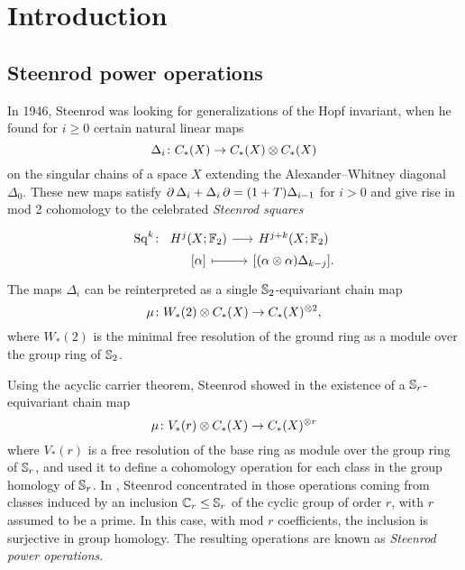 
\section{Introduction}\label{s:introduction}

\subsection{Steenrod power operations}

In 1946, Steenrod was looking for generalizations of the Hopf invariant, when he found for $i \geq 0$ certain natural linear maps
\[
\Delta_i \colon C_{*}(X) \to C_{*}(X) \otimes C_{*}(X)
\]
on the singular chains of a space $X$ extending the Alexander--Whitney diagonal $\Delta_0$.
These new maps satisfy $\operatorname{\partial}\Delta_i + \Delta_i\operatorname{\partial} = (1+T)\Delta_{i-1}$ for $i > 0$ and give rise in mod 2 cohomology to the celebrated \emph{Steenrod squares}
\[
\begin{tikzcd}[column sep=small, row sep=0]
	\Sq^{k} \colon &[-15pt] H^j(X;\mathbb{F}_2) \arrow[r] & H^{j+k}(X;\mathbb{F}_2) \\
	& {[\alpha]} \arrow[r, mapsto] & {[(\alpha \otimes \alpha)\Delta_{k-j}]}.
\end{tikzcd}
\]
The maps $\Delta_i$ can be reinterpreted as a single $\mathbb{S}_2$-equivariant chain map
\[
\mu \colon W_*(2) \otimes C_{*}(X) \to C_{*}(X)^{\otimes 2},
\]
where $W_*(2)$ is the minimal free resolution of the ground ring as a module over the group ring of $\mathbb{S}_2$.

Using the acyclic carrier theorem, Steenrod showed in \cite{steenrod1952reduced} the existence of a $\mathbb{S}_r$-equivariant chain map
\[
\mu \colon V_\ast(r) \otimes C_{*}(X) \to C_{*}(X)^{\otimes r}
\]
where $V_\ast(r)$ is a free resolution of the base ring as module over the group ring of $\mathbb{S}_r$, and used it to define a cohomology operation for each class in the group homology of $\mathbb{S}_r$.
In \cite{steenrod1953cyclic}, Steenrod concentrated in those operations coming from classes induced by an inclusion $\mathbb{C}_r \leq \mathbb{S}_r$ of the cyclic group of order $r$, with $r$ assumed to be a prime.
In this case, with mod $r$ coefficients, the inclusion is surjective in group homology.
The resulting operations are known as \textit{Steenrod power operations}.

